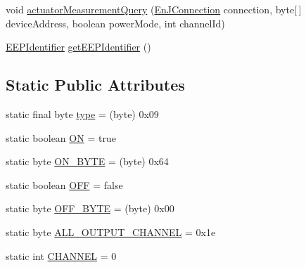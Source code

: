 \begin{DoxyCompactItemize}
\item 
void \hyperlink{classit_1_1polito_1_1elite_1_1enocean_1_1enj_1_1eep_1_1eep26_1_1_d2_1_1_d201_1_1_d20109_a129b92cf8ce706cc65481de4f0a1a453}{actuator\+Measurement\+Query} (\hyperlink{classit_1_1polito_1_1elite_1_1enocean_1_1enj_1_1communication_1_1_en_j_connection}{En\+J\+Connection} connection, byte\mbox{[}$\,$\mbox{]} device\+Address, boolean power\+Mode, int channel\+Id)
\item 
\hyperlink{classit_1_1polito_1_1elite_1_1enocean_1_1enj_1_1eep_1_1_e_e_p_identifier}{E\+E\+P\+Identifier} \hyperlink{classit_1_1polito_1_1elite_1_1enocean_1_1enj_1_1eep_1_1eep26_1_1_d2_1_1_d201_1_1_d20109_a86335aedb1187d18792b80ef8c55bad7}{get\+E\+E\+P\+Identifier} ()
\end{DoxyCompactItemize}
\subsection*{Static Public Attributes}
\begin{DoxyCompactItemize}
\item 
static final byte \hyperlink{classit_1_1polito_1_1elite_1_1enocean_1_1enj_1_1eep_1_1eep26_1_1_d2_1_1_d201_1_1_d20109_a8c9e173baf621192b9b6cce4d08debed}{type} = (byte) 0x09
\item 
static boolean \hyperlink{classit_1_1polito_1_1elite_1_1enocean_1_1enj_1_1eep_1_1eep26_1_1_d2_1_1_d201_1_1_d20109_a573fd5f394d8b2d9e6b49c438942f847}{ON} = true
\item 
static byte \hyperlink{classit_1_1polito_1_1elite_1_1enocean_1_1enj_1_1eep_1_1eep26_1_1_d2_1_1_d201_1_1_d20109_ae9658ff35af9b80eec61d548a75d49a3}{O\+N\+\_\+\+B\+Y\+TE} = (byte) 0x64
\item 
static boolean \hyperlink{classit_1_1polito_1_1elite_1_1enocean_1_1enj_1_1eep_1_1eep26_1_1_d2_1_1_d201_1_1_d20109_a3c1799ceaed541d7b9fa957d3856fd71}{O\+FF} = false
\item 
static byte \hyperlink{classit_1_1polito_1_1elite_1_1enocean_1_1enj_1_1eep_1_1eep26_1_1_d2_1_1_d201_1_1_d20109_a50a36b27614e79f73f8a7d9ebfc74a63}{O\+F\+F\+\_\+\+B\+Y\+TE} = (byte) 0x00
\item 
static byte \hyperlink{classit_1_1polito_1_1elite_1_1enocean_1_1enj_1_1eep_1_1eep26_1_1_d2_1_1_d201_1_1_d20109_a83a983f528bcc4eb3d6f8d19e4794ec9}{A\+L\+L\+\_\+\+O\+U\+T\+P\+U\+T\+\_\+\+C\+H\+A\+N\+N\+EL} = 0x1e
\item 
static int \hyperlink{classit_1_1polito_1_1elite_1_1enocean_1_1enj_1_1eep_1_1eep26_1_1_d2_1_1_d201_1_1_d20109_af1dec0d6e52e3ca354bc96d25cfb5f12}{C\+H\+A\+N\+N\+EL} = 0
\end{DoxyCompactItemize}
